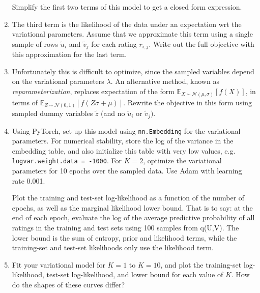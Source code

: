 \documentclass{harvardml}
\theoremstyle{plain}
\begin{document}
\begin{problem}
\begin{enumerate}
Simplify the first two terms of this model to get a closed form expression.


\item The third term is the likelihood of the data under an expectation wrt the variational parameters.
  Assume that we approximate this term using a single sample of rows $\tilde{u}_{i}$  and $\tilde{v}_{j}$
  for each rating $r_{i,j}$. Write out the full objective with this approximation for the last term.

\item  Unfortunately this is difficult to optimize, since the sampled variables depend on the variational parameters $\lambda$. An alternative method, known as \textit{reparameterization}, replaces expectation of the form $\mathbb{E}_{X \sim \mathcal{N}(\mu, \sigma)}[f(X)]$, in terms of $\mathbb{E}_{Z \sim \mathcal{N}(0, 1)}[f(Z \sigma + \mu)]$. Rewrite the objective in this form using sampled dummy variables $\tilde{z}$ (and no
  $\tilde{u}_{i}$  or $\tilde{v}_{j})$.

\item Using PyTorch, set up this model using \texttt{nn.Embedding} for the variational parameters. For numerical stability, store the log of the variance in
  the embedding table, and also initialize this table with very low values, e.g. \texttt{logvar.weight.data = -1000}. 
  For $K = 2$, optimize the variational parameters for 10 epochs over the sampled data.  Use Adam with learning rate 0.001.

Plot the training and test-set log-likelihood as a function of the number of epochs, as well as the marginal likelihood lower bound.
That is to say: at the end of each epoch, evaluate the log of the average predictive probability of all ratings in the training and test sets using 100 samples from q(U,V).
The lower bound is the sum of entropy, prior and likelihood terms, while the training-set and test-set likelihoods only use the likelihood term.

\item Fit your variational model for $K = 1$ to $K = 10$, and plot the training-set log-likelihood, test-set log-likelihood, and lower bound for each value of $K$.
How do the shapes of these curves differ?



\end{enumerate}
\end{problem}
\end{document}
